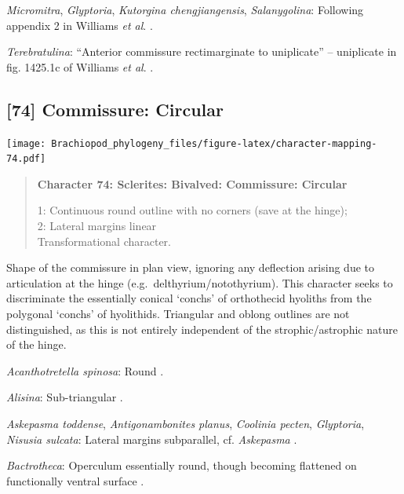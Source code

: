 \documentclass[openany]{book}
\begin{document}
\hypertarget{Glyptoria-coding-73}{}
\emph{Micromitra}, \emph{Glyptoria}, \emph{Kutorgina chengjiangensis},
\emph{Salanygolina}: Following appendix 2 in Williams \emph{et al}.
\citeyearpar{Williams1998Thediversity}.

\hypertarget{Terebratulina-coding-73}{}
\emph{Terebratulina}: ``Anterior commissure rectimarginate to
uniplicate'' -- uniplicate in fig. 1425.1c of Williams \emph{et al}.
\citeyearpar{Williams2006Rhynchonelliformeapart}.

\subsection*{{[}74{]} Commissure: Circular}\label{commissure-circular}

\texttt{[image: Brachiopod\_phylogeny\_files/figure-latex/character-mapping-74.pdf]}

\begin{quote}
\textbf{Character 74: Sclerites: Bivalved: Commissure: Circular}

1: Continuous round outline with no corners (save at the hinge);\\
2: Lateral margins linear\\
Transformational character.
\end{quote}

Shape of the commissure in plan view, ignoring any deflection arising
due to articulation at the hinge (e.g.~delthyrium/notothyrium). This
character seeks to discriminate the essentially conical `conchs' of
orthothecid hyoliths from the polygonal `conchs' of hyolithids.
Triangular and oblong outlines are not distinguished, as this is not
entirely independent of the strophic/astrophic nature of the hinge.

\hypertarget{Acanthotretella_spinosa-coding-74}{}
\emph{Acanthotretella spinosa}: Round \citep{Holmer2006Aspinose}.

\hypertarget{Alisina-coding-74}{}
\emph{Alisina}: Sub-triangular \citep{Zhang2011Anobolellate}.

\hypertarget{Antigonambonites_planus-coding-74}{}
\emph{Askepasma toddense}, \emph{Antigonambonites planus},
\emph{Coolinia pecten}, \emph{Glyptoria}, \emph{Nisusia sulcata}:
Lateral margins subparallel, cf. \emph{Askepasma}
\citep{Williams2000LinguliformeaCraniiformea}.

\hypertarget{Bactrotheca-coding-74}{}
\emph{Bactrotheca}: Operculum essentially round, though becoming
flattened on functionally ventral surface \citep{Dzik1980Ontogenyof}.
\end{document}
